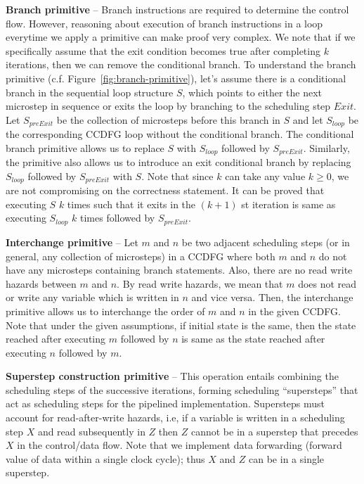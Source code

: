 {\textbf {Branch primitive}} -- Branch instructions are required to determine the control flow. However, reasoning about execution of branch instructions in a loop everytime we apply a primitive can make proof very complex.
We note that if we specifically assume that the exit condition becomes true after completing $k$ iterations, then we can remove the conditional branch.
To understand the branch primitive (c.f. Figure~\ref{fig:branch-primitive}), 
let's assume there is a conditional branch in the sequential loop structure $S$, which points to either
the next microstep in sequence or exits the loop by branching to the scheduling step
$Exit$. Let $S_{preExit}$ be the collection of microsteps before this branch in $S$ and
let $S_{loop}$ be the corresponding CCDFG loop without the conditional branch.
The conditional branch primitive allows us to replace $S$ with $S_{loop}$ followed by
$S_{preExit}$. Similarly,
the primitive also allows us to introduce an exit conditional branch by replacing
$S_{loop}$ followed by $S_{preExit}$ with $S$.
Note that since $k$ can take any value $k \ge 0$, we are not compromising on the correctness statement.  
It can be proved that executing $S$ $k$ times such that it exits in the $(k+1)$ st
iteration is same as executing $S_{loop}$ $k$ times followed by $S_{preExit}$.

{\textbf {Interchange primitive}} -- Let $m$ and $n$ be two adjacent scheduling steps (or in general, any collection of microsteps) in a CCDFG where both $m$ and $n$ do not have any microsteps containing branch statements. Also, there are no read write hazards between $m$ and $n$. By read write hazards, we mean that $m$ does not read or write any variable which is written in $n$ and vice versa. Then, the interchange primitive allows us to interchange the order of $m$ and $n$ in the given CCDFG. Note that under the given assumptions, if initial state is the same, then the state reached after executing $m$ followed by $n$ is same as the state reached after executing $n$ followed by $m$.

{\textbf {Superstep construction primitive}} -- This operation entails combining the scheduling steps of the successive
iterations, forming scheduling ``supersteps'' that act as scheduling steps for the pipelined implementation. Supersteps must
account for read-after-write hazards, i.e, if a variable is written in a scheduling step $X$ and read subsequently in
$Z$ then $Z$ cannot be in a superstep that precedes $X$ in the control/data flow.  Note that we implement data
forwarding (forward value of data within a single clock cycle); thus $X$ and $Z$ can be in a single superstep.


